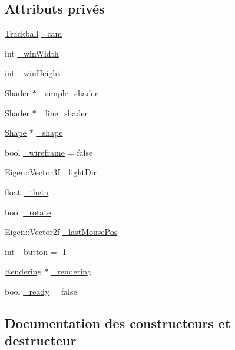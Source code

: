\subsection*{Attributs privés}
\begin{DoxyCompactItemize}
\item 
\hyperlink{class_trackball}{Trackball} \hyperlink{class_viewer_ae5cf141efe1b370bddb3aee4f459aae6}{\+\_\+cam}
\item 
int \hyperlink{class_viewer_a5ed35052dd2cafc37dcb9ebdc707b0ee}{\+\_\+win\+Width}
\item 
int \hyperlink{class_viewer_aa9b2ec5f7c556f9c21bd4db90db4adc3}{\+\_\+win\+Height}
\item 
\hyperlink{class_shader}{Shader} $\ast$ \hyperlink{class_viewer_a28fb6ad2e98323a2e15cf8d3f6250715}{\+\_\+simple\+\_\+shader}
\item 
\hyperlink{class_shader}{Shader} $\ast$ \hyperlink{class_viewer_a8179d29882494d1c22c9f1836a374eab}{\+\_\+line\+\_\+shader}
\item 
\hyperlink{class_shape}{Shape} $\ast$ \hyperlink{class_viewer_a4da6f3bfd65c6e60809d1ca6bccba84c}{\+\_\+shape}
\item 
bool \hyperlink{class_viewer_a3316af44dc82836ab420a1c1dd7de738}{\+\_\+wireframe} = false
\item 
Eigen\+::\+Vector3f \hyperlink{class_viewer_a821af83607bfed860f0d3566dd9db597}{\+\_\+light\+Dir}
\item 
float \hyperlink{class_viewer_a4f1313a7d9a6b81079985c9ad0f93e0c}{\+\_\+theta}
\item 
bool \hyperlink{class_viewer_a5ec677d1951652c794bcdea1663e1fb7}{\+\_\+rotate}
\item 
Eigen\+::\+Vector2f \hyperlink{class_viewer_a809a18b8663d86d127fee482326919ad}{\+\_\+last\+Mouse\+Pos}
\item 
int \hyperlink{class_viewer_aebac1d4a942eab5c1bfcfe46c67f7c6a}{\+\_\+button} = -\/1
\item 
\hyperlink{class_rendering}{Rendering} $\ast$ \hyperlink{class_viewer_a58d6891d6b99ada90a627407fd5e7b8f}{\+\_\+rendering}
\item 
bool \hyperlink{class_viewer_a16a03e43d748a30a2a7413abeb949c4c}{\+\_\+ready} = false
\end{DoxyCompactItemize}


\subsection{Documentation des constructeurs et destructeur}
\mbox{\label{class_viewer_a29d3e7c2922835cbd92c285c709dbe30}} 
